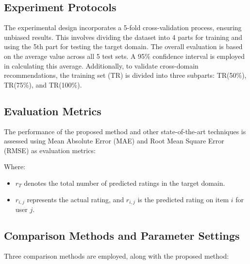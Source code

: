 \documentclass{article}
\begin{document}
\subsection{Experiment Protocols}

The experimental design incorporates a 5-fold cross-validation process, ensuring unbiased results. This involves dividing the dataset into 4 parts for training and using the 5th part for testing the target domain. The overall evaluation is based on the average value across all 5 test sets. A 95\% confidence interval is employed in calculating this average. Additionally, to validate cross-domain recommendations, the training set (TR) is divided into three subparts: TR(50\%), TR(75\%), and TR(100\%).

\subsection{Evaluation Metrics}

The performance of the proposed method and other state-of-the-art techniques is assessed using Mean Absolute Error (MAE) and Root Mean Square Error (RMSE) as evaluation metrics:


Where:
\begin{itemize}
    \item $r_T$ denotes the total number of predicted ratings in the target domain.
    \item $r_{i, j}$ represents the actual rating, and $\hat{r}_{i, j}$ is the predicted rating on item $i$ for user $j$.
\end{itemize}

\subsection{Comparison Methods and Parameter Settings}

Three comparison methods are employed, along with the proposed method:
\end{document}
